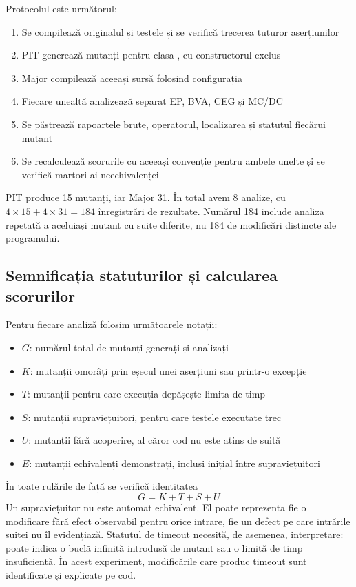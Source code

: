 \documentclass[11pt,a4paper]{article}
\begin{document}
Protocolul este următorul:
\begin{enumerate}[label=\arabic*.,leftmargin=*]
\item Se compilează originalul și testele și se verifică trecerea tuturor aserțiunilor
\item PIT generează mutanți pentru clasa , cu constructorul exclus
\item Major compilează aceeași sursă folosind configurația 
\item Fiecare unealtă analizează separat EP, BVA, CEG și MC/DC
\item Se păstrează rapoartele brute, operatorul, localizarea și statutul fiecărui mutant
\item Se recalculează scorurile cu aceeași convenție pentru ambele unelte și se verifică martori ai neechivalenței
\end{enumerate}

PIT produce 15 mutanți, iar Major 31. 
În total avem 8 analize, cu $4\times15+4\times31=184$ înregistrări de rezultate.
Numărul 184 include analiza repetată a aceluiași mutant cu suite diferite,
nu 184 de modificări distincte ale programului.

\subsection{Semnificația statuturilor și calcularea scorurilor}
Pentru fiecare analiză folosim următoarele notații:
\begin{itemize}[label=\textbullet]
\item $G$: numărul total de mutanți generați și analizați
\item $K$: mutanții omorâți prin eșecul unei aserțiuni sau printr-o excepție
\item $T$: mutanții pentru care execuția depășește limita de timp
\item $S$: mutanții supraviețuitori, pentru care testele executate trec
\item $U$: mutanții fără acoperire, al căror cod nu este atins de suită
\item $E$: mutanții echivalenți demonstrați, incluși inițial între supraviețuitori
\end{itemize}
În toate rulările de față se verifică identitatea
\[
G=K+T+S+U
\]
Un supraviețuitor nu este automat echivalent. El poate reprezenta fie o
modificare fără efect observabil pentru orice intrare, fie un defect pe care
intrările suitei nu îl evidențiază. Statutul de timeout necesită, de asemenea,
interpretare: poate indica o buclă infinită introdusă de mutant sau o limită
de timp insuficientă. În acest experiment, modificările care produc timeout
sunt identificate și explicate pe cod.
\end{document}
